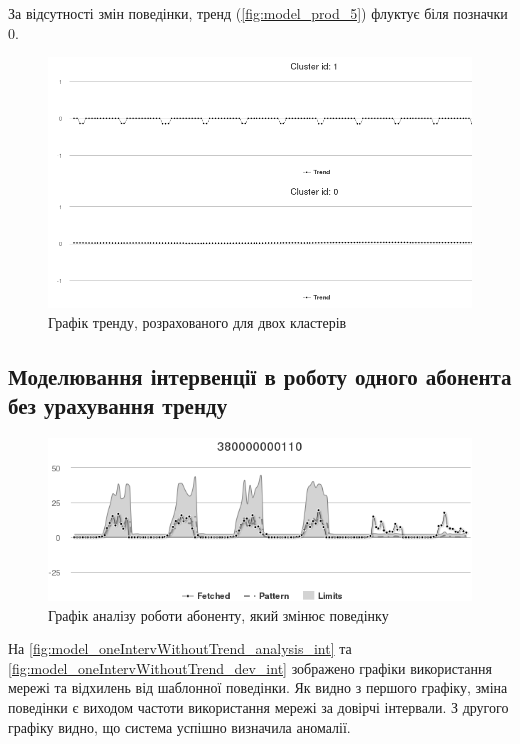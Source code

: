 За відсутності змін поведінки, тренд (\autoref{fig:model_prod_5}) флуктує біля позначки 0.

\begin{figure}[h!]
        \begin{center}
            \includegraphics[scale=0.55]{resources/model_2_5.png}
        \end{center}
        \caption{Графік тренду, розрахованого для двох кластерів}
        \label{fig:model_prod_5}
\end{figure}

\subsection{Моделювання інтервенції в роботу одного абонента без урахування тренду}

\begin{figure}[h!]
        \begin{center}
            \includegraphics[scale=0.55]{resources/oneIntervWithoutTrend/analysis.png}
        \end{center}
        \caption{Графік аналізу роботи абоненту, який змінює поведінку}
        \label{fig:model_oneIntervWithoutTrend_analysis_int}
\end{figure}
На \autoref{fig:model_oneIntervWithoutTrend_analysis_int} та \autoref{fig:model_oneIntervWithoutTrend_dev_int} зображено графіки використання мережі та відхилень від шаблонної поведінки. Як видно з першого графіку, зміна поведінки є виходом частоти використання мережі за довірчі інтервали. З другого графіку видно, що система успішно визначила аномалії.

